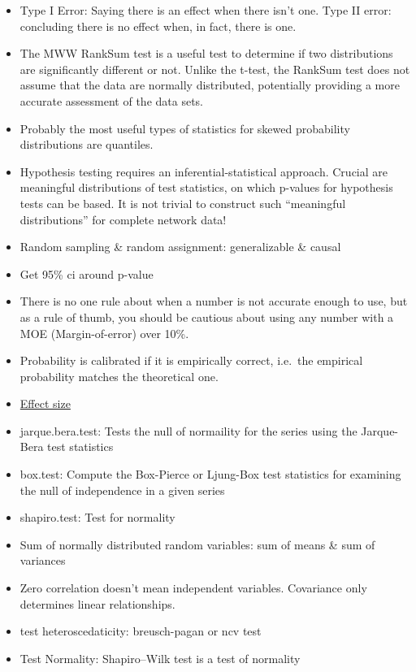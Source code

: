 \documentclass[]{book}
\theoremstyle{definition}
\theoremstyle{definition}
\theoremstyle{definition}
\theoremstyle{remark}
\begin{document}
\begin{itemize}
\item
  Type I Error: Saying there is an effect when there isn't one. Type II
  error: concluding there is no effect when, in fact, there is one.
\item
  The MWW RankSum test is a useful test to determine if two
  distributions are significantly different or not. Unlike the t-test,
  the RankSum test does not assume that the data are normally
  distributed, potentially providing a more accurate assessment of the
  data sets.
\item
  Probably the most useful types of statistics for skewed probability
  distributions are quantiles.
\item
  Hypothesis testing requires an inferential-statistical approach.
  Crucial are meaningful distributions of test statistics, on which
  p-values for hypothesis tests can be based. It is not trivial to
  construct such ``meaningful distributions'' for complete network data!
\item
  Random sampling \& random assignment: generalizable \& causal
\item
  Get 95\% ci around p-value
\item
  There is no one rule about when a number is not accurate enough to
  use, but as a rule of thumb, you should be cautious about using any
  number with a MOE (Margin-of-error) over 10\%.
\item
  Probability is calibrated if it is empirically correct, i.e.~the
  empirical probability matches the theoretical one.
\item
  \href{https://artax.karlin.mff.cuni.cz/r-help/library/lsr/html/cohensD.html}{Effect
  size}
\item
  jarque.bera.test: Tests the null of normaility for the series using
  the Jarque-Bera test statistics
\item
  box.test: Compute the Box-Pierce or Ljung-Box test statistics for
  examining the null of independence in a given series
\item
  shapiro.test: Test for normality
\item
  Sum of normally distributed random variables: sum of means \& sum of
  variances
\item
  Zero correlation doesn't mean independent variables. Covariance only
  determines linear relationships.
\item
  test heteroscedaticity: breusch-pagan or ncv test
\item
  Test Normality: Shapiro--Wilk test is a test of normality

\end{itemize}
\end{document}
